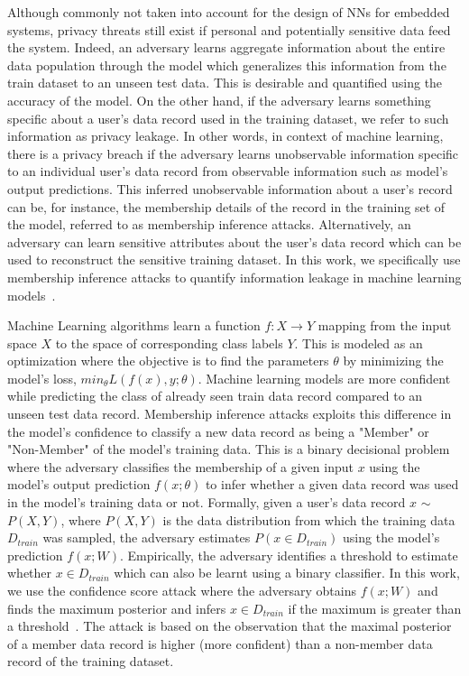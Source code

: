 Although commonly not taken into account for the design of NNs for embedded systems, privacy threats still exist if personal and potentially sensitive data feed the system.
Indeed, an adversary learns aggregate information about the entire data population through the model which generalizes this information from the train dataset to an unseen test data.
This is desirable and quantified using the accuracy of the model.
On the other hand, if the adversary learns something specific about a user's data record used in the training dataset, we refer to such information as privacy leakage.
In other words, in context of machine learning, there is a privacy breach if the adversary learns unobservable information specific to an individual user's data record from observable information such as model's output predictions.
This inferred unobservable information about a user's record can be, for instance, the membership details of the record in the training set of the model, referred to as membership inference attacks.
Alternatively, an adversary can learn sensitive attributes about the user's data record which can be used to reconstruct the sensitive training dataset.
In this work, we specifically use membership inference attacks to quantify information leakage in machine learning models~\cite{shokri2017membership}.


Machine Learning algorithms learn a function $f:X \rightarrow Y$ mapping from the input space $X$ to the space of corresponding class labels $Y$.
This is modeled as an optimization where the objective is to find the parameters $\theta$ by minimizing the model's loss, $min_{\theta} L(f(x),y;\theta)$.
Machine learning models are more confident while predicting the class of already seen train data record compared to an unseen test data record.
Membership inference attacks exploits this difference in the model's confidence to classify a new data record as being a "Member" or "Non-Member" of the model's training data.
This is a binary decisional problem where the adversary classifies the membership of a given input $x$ using the model's output prediction  $f(x;\theta)$ to infer whether a given data record was used in the model's training data or not.
Formally, given a user's data record $x$ $\sim$ $P(X,Y)$, where $P(X,Y)$ is the data distribution from which the training data $D_{train}$ was sampled, the adversary estimates $P(x \in D_{train})$ using the model's prediction $f(x;W)$.
Empirically, the adversary identifies a threshold to estimate whether $x \in D_{train}$ which can also be learnt using a binary classifier.
In this work, we use the confidence score attack where the adversary obtains $f(x;W)$ and finds the maximum posterior and infers $x \in D_{train}$ if the maximum is greater than a threshold~\cite{salem2018ml,8429311}.
The attack is based on the observation that the maximal posterior of a member data record is higher (more confident) than a non-member data record of the training dataset.


